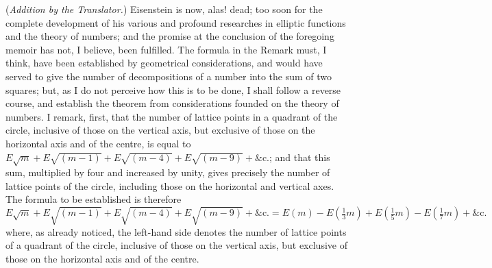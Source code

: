 \documentclass[11pt]{article}
\begin{document}
(\textit{Addition by the Translator.}) Eisenstein is now, alas! dead; too soon for the complete
development of his various and profound researches in elliptic functions and the
theory of numbers; and the promise at the conclusion of the foregoing memoir has
not, I believe, been fulfilled. The formula in the Remark must, I think, have been
established by geometrical considerations, and would have served to give the number
of decompositions of a number into the sum of two squares; but, as I do not perceive
how this is to be done, I shall follow a reverse course, and establish the theorem
from considerations founded on the theory of numbers. I remark, first, that the
number of lattice points in a quadrant of the circle, inclusive of those on the vertical
axis, but exclusive of those on the horizontal axis and of the centre, is equal to
$E\sqrt{m} + E\sqrt{(m - 1)} + E\sqrt{(m - 4)} + E\sqrt{(m - 9)} + \&\text{c.}$; and that this sum, multiplied by four
and increased by unity, gives precisely the number of lattice points of the circle,
including those on the horizontal and vertical axes. The formula to be established is
therefore
\[
E\sqrt{m} + E\sqrt{(m-1)} + E\sqrt{(m-4)} + E\sqrt{(m-9)} + \&\text{c.} = E(m) - E(\tfrac{1}{3} m) + E(\tfrac{1}{5} m) - E(\tfrac{1}{7} m) + \&\text{c.}
\]
where, as already noticed, the left-hand side denotes the number of lattice points of
a quadrant of the circle, inclusive of those on the vertical axis, but exclusive of those
on the horizontal axis and of the centre.
\end{document}
